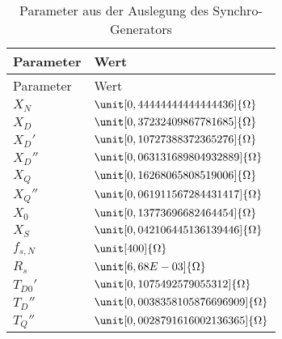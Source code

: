 \begin{longtable}[]{@{}ll@{}}
\caption{Parameter aus der Auslegung des
Synchro-Generators}\tabularnewline
\toprule
Parameter & Wert\tabularnewline
\midrule
\endfirsthead
\toprule
Parameter & Wert\tabularnewline
\midrule
\endhead
\(X_N\) & \(\unit[0,44444444444444436]{\Omega}\)\tabularnewline
\(X_D\) & \(\unit[0,37232409867781685]{\Omega}\)\tabularnewline
\(X_D'\) & \(\unit[0,10727388372365276]{\Omega}\)\tabularnewline
\(X_D''\) & \(\unit[0,063131689804932889]{\Omega}\)\tabularnewline
\(X_Q\) & \(\unit[0,16268065808519006]{\Omega}\)\tabularnewline
\(X_Q''\) & \(\unit[0,061911567284431417]{\Omega}\)\tabularnewline
\(X_0\) & \(\unit[0,13773696682464454]{\Omega}\)\tabularnewline
\(X_S\) & \(\unit[0,042106445136139446]{\Omega}\)\tabularnewline
\(f_{s,N}\) & \(\unit[400]{\Omega}\)\tabularnewline
\(R_s\) & \(\unit[6,68E-03]{\Omega}\)\tabularnewline
\(T_{D0}'\) & \(\unit[0,1075492579055312]{\Omega}\)\tabularnewline
\(T_D''\) & \(\unit[0,0038358105876696909]{\Omega}\)\tabularnewline
\(T_Q''\) & \(\unit[0,0028791616002136365]{\Omega}\)\tabularnewline
\bottomrule
\end{longtable}

